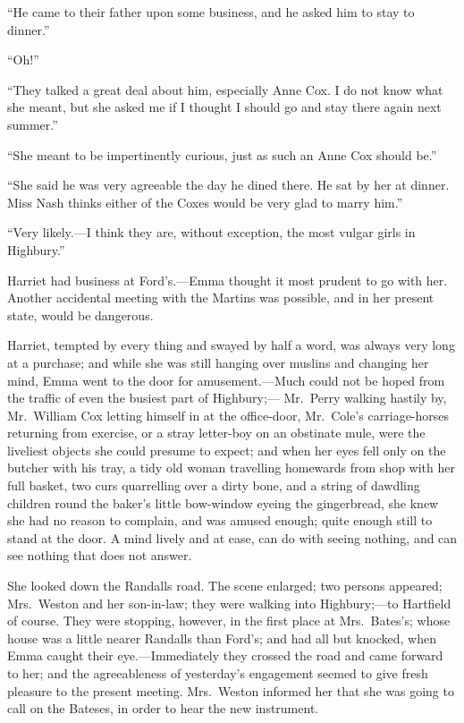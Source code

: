 ``He came to their father upon some business, and he asked him
to stay to dinner.''

``Oh!''

``They talked a great deal about him, especially Anne Cox.
I do not know what she meant, but she asked me if I thought I
should go and stay there again next summer.''

``She meant to be impertinently curious, just as such an Anne Cox
should be.''

``She said he was very agreeable the day he dined there.  He sat
by her at dinner.  Miss Nash thinks either of the Coxes would
be very glad to marry him.''

``Very likely.---I think they are, without exception, the most vulgar
girls in Highbury.''

Harriet had business at Ford's.---Emma thought it most prudent to go
with her.  Another accidental meeting with the Martins was possible,
and in her present state, would be dangerous.

Harriet, tempted by every thing and swayed by half a word, was always
very long at a purchase; and while she was still hanging over muslins
and changing her mind, Emma went to the door for amusement.---Much could
not be hoped from the traffic of even the busiest part of Highbury;---%
Mr.\ Perry walking hastily by, Mr.\ William Cox letting himself in at
the office-door, Mr.\ Cole's carriage-horses returning from exercise,
or a stray letter-boy on an obstinate mule, were the liveliest
objects she could presume to expect; and when her eyes fell only on
the butcher with his tray, a tidy old woman travelling homewards from
shop with her full basket, two curs quarrelling over a dirty bone,
and a string of dawdling children round the baker's little bow-window
eyeing the gingerbread, she knew she had no reason to complain,
and was amused enough; quite enough still to stand at the door.
A mind lively and at ease, can do with seeing nothing, and can see
nothing that does not answer.

She looked down the Randalls road.  The scene enlarged;
two persons appeared; Mrs.\ Weston and her son-in-law; they were
walking into Highbury;---to Hartfield of course.  They were stopping,
however, in the first place at Mrs.\ Bates's; whose house was
a little nearer Randalls than Ford's; and had all but knocked,
when Emma caught their eye.---Immediately they crossed the road
and came forward to her; and the agreeableness of yesterday's
engagement seemed to give fresh pleasure to the present meeting.
Mrs.\ Weston informed her that she was going to call on the Bateses,
in order to hear the new instrument.

